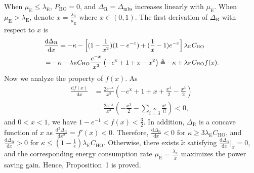 \documentclass[12pt, draftclsnofoot,onecolumn]{IEEEtran}
\begin{document}
When $\mu_\mathrm{E}\leq\lambda_\mathrm{E}$, $P_\mathrm{HO}=0$, and $\Delta_\mathrm{R} = \Delta_\mathrm{mbs}$ increases linearly with $\mu_\mathrm{E}$.
When $\mu_\mathrm{E}>\lambda_\mathrm{E}$, denote $x = \frac{\lambda_\mathrm{E}}{\mu_\mathrm{E}}$ where $x\in(0,1)$.
The first derivation of $\Delta_\mathrm{R}$ with respect to $x$ is
\begin{equation}\label{appendix_diff_delta_g}\small
    \begin{split}
    & \frac{\mathrm{d} \Delta_\mathrm{R}}{\mathrm{d} x} = - \kappa - \left[ (1-\frac{1}{x^2})(1-e^{-x}) +(\frac{1}{x}-1)e^{-x} \right] \lambda_\mathrm{E} C_\mathrm{HO}\\
    & = - \kappa - \lambda_\mathrm{E} C_\mathrm{HO} \frac{e^{-x}}{x^2} \left( -e^\mathrm{x} +1+x-x^2 \right) \triangleq - \kappa + \lambda_\mathrm{E} C_\mathrm{HO} f(x).
    \end{split}
\end{equation}
Now we analyze the property of $f(x)$. As
\begin{subequations}\label{appendix_fx}
    \begin{align}
    \frac{\mathrm{d}f(x)}{\mathrm{d}x} & = \frac{2 e^{-x}}{x^3} \left( -e^\mathrm{x} +1+x+\frac{x^2}{2} - \frac{x^3}{2}  \right)\\
    & = \frac{2 e^{-x}}{x^3} \left( - \frac{x^3}{2} - \sum\limits_{i=3}\limits^{\infty} \frac{x^i}{i!}  \right) <0,
    \end{align}
\end{subequations}
and $0<x<1$, we have $ 1-e^{-1}<f(x)<\frac{3}{2}$.
In addition, $\Delta_\mathrm{R}$ is a concave function of $x$ as $\frac{\mathrm{d}^2 \Delta_\mathrm{R}}{\mathrm{d} x^2} = f'(x)<0$. Therefore, $\frac{\mathrm{d} \Delta_\mathrm{R}}{\mathrm{d} x} < 0$ for $\kappa \geq 3\lambda_\mathrm{E}C_\mathrm{HO}$, and $\frac{\mathrm{d} \Delta_\mathrm{R}}{\mathrm{d} x} > 0$ for $\kappa \leq (1-\frac{1}{e}) \lambda_\mathrm{E}C_\mathrm{HO}$.
Otherwise, there exists $\tilde{x}$ satisfying $ \frac{\mathrm{d} \Delta_\mathrm{R}}{\mathrm{d} x}|_{\tilde{x}} = 0$, and the corresponding energy consumption rate $\mu_\mathrm{E} = \frac{\lambda_\mathrm{E}}{\tilde{x}}$ maximizes the power saving gain. Hence, Proposition~1 is proved.  
\end{document}

